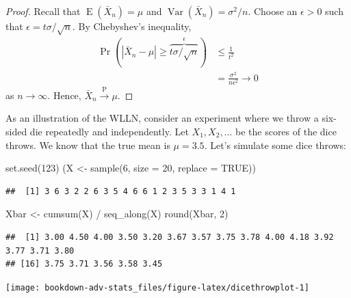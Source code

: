 \documentclass[
]{book}
\newenvironment{Shaded}{\begin{snugshade}}{\end{snugshade}}
\newcommand{\AttributeTok}[1]{\textcolor[rgb]{0.77,0.63,0.00}{#1}}
\newcommand{\ConstantTok}[1]{\textcolor[rgb]{0.00,0.00,0.00}{#1}}
\newcommand{\DecValTok}[1]{\textcolor[rgb]{0.00,0.00,0.81}{#1}}
\newcommand{\FunctionTok}[1]{\textcolor[rgb]{0.00,0.00,0.00}{#1}}
\newcommand{\NormalTok}[1]{#1}
\newcommand{\OtherTok}[1]{\textcolor[rgb]{0.56,0.35,0.01}{#1}}
\newcommand{\SpecialCharTok}[1]{\textcolor[rgb]{0.00,0.00,0.00}{#1}}
\DeclareMathOperator{\E}{E}
\DeclareMathOperator{\Var}{Var}
\theoremstyle{definition}
\theoremstyle{definition}
\theoremstyle{definition}
\theoremstyle{definition}
\theoremstyle{remark}
\begin{document}
\begin{proof}
Recall that \(\E(\bar X_n)=\mu\) and \(\Var(\bar X_n) = \sigma^2/n\).
Choose an \(\epsilon >0\) such that \(\epsilon=t\sigma/\sqrt{n}\).
By Chebyshev's inequality,
\begin{align*}
\Pr(|\bar X_n - \mu| \geq \overbrace{t\sigma/\sqrt{n}}^{\epsilon}) 
&\leq \frac{1}{t^2}\\
&=\frac{\sigma^2}{n\epsilon^2} \to 0
\end{align*}
as \(n\to\infty\).
Hence, \(\bar X_n{\xrightarrow{\text{P}}} \mu\).
\end{proof}

As an illustration of the WLLN, consider an experiment where we throw a six-sided die repeatedly and independently.
Let \(X_1,X_2,\dots\) be the scores of the dice throws.
We know that the true mean is \(\mu=3.5\).
Let's simulate some dice throws:

\begin{Shaded}
\begin{Highlighting}[]
\FunctionTok{set.seed}\NormalTok{(}\DecValTok{123}\NormalTok{)}
\NormalTok{(X }\OtherTok{\textless{}{-}} \FunctionTok{sample}\NormalTok{(}\DecValTok{6}\NormalTok{, }\AttributeTok{size =} \DecValTok{20}\NormalTok{, }\AttributeTok{replace =} \ConstantTok{TRUE}\NormalTok{))}
\end{Highlighting}
\end{Shaded}

\begin{verbatim}
##  [1] 3 6 3 2 2 6 3 5 4 6 6 1 2 3 5 3 3 1 4 1
\end{verbatim}

\begin{Shaded}
\begin{Highlighting}[]
\NormalTok{Xbar }\OtherTok{\textless{}{-}} \FunctionTok{cumsum}\NormalTok{(X) }\SpecialCharTok{/} \FunctionTok{seq\_along}\NormalTok{(X)}
\FunctionTok{round}\NormalTok{(Xbar, }\DecValTok{2}\NormalTok{)}
\end{Highlighting}
\end{Shaded}

\begin{verbatim}
##  [1] 3.00 4.50 4.00 3.50 3.20 3.67 3.57 3.75 3.78 4.00 4.18 3.92 3.77 3.71 3.80
## [16] 3.75 3.71 3.56 3.58 3.45
\end{verbatim}

\begin{center}\texttt{[image: bookdown-adv-stats\_files/figure-latex/dicethrowplot-1]} \end{center}
\end{document}
